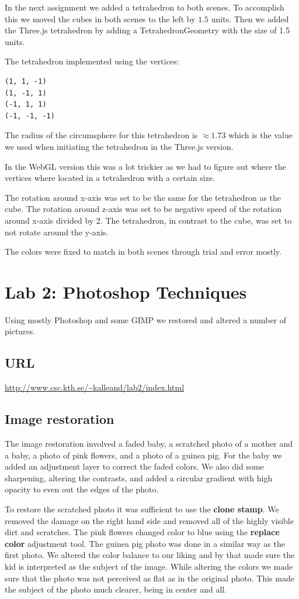 \documentclass[a4paper]{article}
\begin{document}
In the next assignment we added a tetrahedron to both scenes. To accomplish this
we moved the cubes in both scenes to the left by $1.5$ units. Then we added the
Three.js tetrahedron by adding a TetrahedronGeometry with the size of 1.5 units.

The tetrahedron implemented using the vertices:

\begin{verbatim}
(1, 1, -1)
(1, -1, 1)
(-1, 1, 1)
(-1, -1, -1)
\end{verbatim}

The radius of the circumsphere for this tetrahedron is $\approx 1.73$ which is
the value we used when initiating the tetrahedron in the Three.js version.

In the WebGL version this was a lot trickier as we had to figure out where the
vertices where located in a tetrahedron with a certain size.

The rotation around x-axis was set to be the same for the tetrahedron as the
cube. The rotation around z-axis was set to be negative speed of the rotation
around x-axis divided by 2. The tetrahedron, in contrast to the cube, was set to
not rotate around the y-axis.

The colors were fixed to match in both scenes through trial and error mostly.
\newpage
\section{Lab 2: Photoshop Techniques}
Using mostly Photoshop and some GIMP we restored and altered a number of pictures.

\subsection*{URL}
\url{http://www.csc.kth.se/~kalleand/lab2/index.html}

\subsection{Image restoration} %
The image restoration involved a faded baby, a scratched photo of a mother and a
baby, a photo of pink flowers, and a photo of a guinea pig. For the baby we
added an adjustment layer to correct the faded colors. We also did some
sharpening, altering the contrasts, and added a circular gradient with high
opacity to even out the edges of the photo.

To restore the scratched photo it was sufficient to use the \textbf{clone
stamp}. We removed the damage on the right hand side and removed all of the
highly visible dirt and scratches. The pink flowers changed color to blue using
the \textbf{replace color} adjustment tool. The guinea pig photo was done in a
similar way as the first photo. We altered the color balance to our liking and
by that made sure the kid is interpreted as the subject of the image. While
altering the colors we made sure that the photo was not perceived as flat as in
the original photo. This made the subject of the photo much clearer, being in
center and all.
\end{document}
